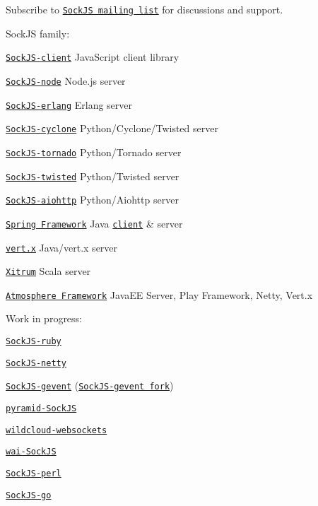 Subscribe to \href{https://groups.google.com/forum/#!forum/sockjs}{\tt Sock\+JS mailing list} for discussions and support.

Sock\+JS family\+:


\begin{DoxyItemize}
\item \href{https://github.com/sockjs/sockjs-client}{\tt Sock\+J\+S-\/client} Java\+Script client library
\item \href{https://github.com/sockjs/sockjs-node}{\tt Sock\+J\+S-\/node} Node.\+js server
\item \href{https://github.com/sockjs/sockjs-erlang}{\tt Sock\+J\+S-\/erlang} Erlang server
\item \href{https://github.com/flaviogrossi/sockjs-cyclone}{\tt Sock\+J\+S-\/cyclone} Python/\+Cyclone/\+Twisted server
\item \href{https://github.com/MrJoes/sockjs-tornado}{\tt Sock\+J\+S-\/tornado} Python/\+Tornado server
\item \href{https://github.com/DesertBus/sockjs-twisted/}{\tt Sock\+J\+S-\/twisted} Python/\+Twisted server
\item \href{https://github.com/aio-libs/sockjs/}{\tt Sock\+J\+S-\/aiohttp} Python/\+Aiohttp server
\item \href{https://projects.spring.io/spring-framework}{\tt Spring Framework} Java \href{https://docs.spring.io/spring-framework/docs/current/spring-framework-reference/html/websocket.html#websocket-fallback-sockjs-client}{\tt client} \& server
\item \href{https://github.com/vert-x/vert.x}{\tt vert.\+x} Java/vert.\+x server
\item \href{https://xitrum-framework.github.io/}{\tt Xitrum} Scala server
\item \href{https://github.com/Atmosphere/atmosphere}{\tt Atmosphere Framework} Java\+EE Server, Play Framework, Netty, Vert.\+x
\end{DoxyItemize}

Work in progress\+:


\begin{DoxyItemize}
\item \href{https://github.com/nyarly/sockjs-ruby}{\tt Sock\+J\+S-\/ruby}
\item \href{https://github.com/cgbystrom/sockjs-netty}{\tt Sock\+J\+S-\/netty}
\item \href{https://github.com/ksava/sockjs-gevent}{\tt Sock\+J\+S-\/gevent} (\href{https://github.com/njoyce/sockjs-gevent}{\tt Sock\+J\+S-\/gevent fork})
\item \href{https://github.com/fafhrd91/pyramid_sockjs}{\tt pyramid-\/\+Sock\+JS}
\item \href{https://github.com/wildcloud/wildcloud-websockets}{\tt wildcloud-\/websockets}
\item \href{https://github.com/Palmik/wai-sockjs}{\tt wai-\/\+Sock\+JS}
\item \href{https://github.com/vti/sockjs-perl}{\tt Sock\+J\+S-\/perl}
\item \href{https://github.com/igm/sockjs-go/}{\tt Sock\+J\+S-\/go}
\end{DoxyItemize}

